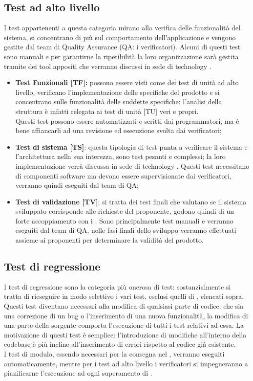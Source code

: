 \documentclass[PianoDiProgetto.tex]{subfiles}
\begin{document}
\subsection{Test ad alto livello}
I test appartenenti a questa categoria mirano alla verifica delle funzionalità del sistema, si concentrano di più sul comportamento dell'applicazione e vengono gestite dal team di Quality Assurance (QA: i verificatori).
Alcuni di questi test sono manuali e per garantirne la ripetibilità la loro organizzazione sarà gestita tramite dei tool appositi che verranno discussi in sede di technology .
\begin{itemize}
	\item \textbf{Test Funzionali [TF]:} possono essere visti come dei test di unità ad alto livello, verificano l'implementazione delle specifiche del prodotto e si concentrano sulle funzionalità delle suddette specifiche: l'analisi della struttura è infatti relegata ai test di unità [TU] veri e propri. \\
	Questi test possono essere automatizzati e scritti dai programmatori, ma è bene affiancarli ad una revisione ed esecuzione svolta dai verificatori;
	\item \textbf{Test di sistema [TS]}: questa tipologia di test punta a verificare il sistema e l'architettura nella sua interezza, sono test pesanti e complessi; la loro implementazione verrà discussa in sede di technology . 
	Questi test necessitano di componenti software ma devono essere supervisionate dai verificatori, verranno quindi eseguiti dal team di QA;
	\item \textbf{Test di validazione [TV]}: si tratta dei test finali che valutano se il sistema sviluppato corrisponde alle richieste del proponente, godono quindi di un forte accoppiamento con i . Sono principalmente test manuali e verranno eseguiti dal team di QA, nelle fasi finali dello sviluppo verranno effettuati assieme ai proponenti per determinare la validità del prodotto.
\end{itemize}

\subsection{Test di regressione}
I test di regressione sono la categoria più onerosa di test: sostanzialmente si tratta di rieseguire in modo selettivo i vari test, esclusi quelli di , elencati sopra.\\
Questi test diventano necessari alla modifica di qualsiasi parte di codice: che sia una correzione di un bug o l'inserimento di una nuova funzionalità, la modifica di una parte della sorgente comporta l'esecuzione di tutti i test relativi ad essa. La motivazione di questi test è semplice: l'introduzione di modifiche all'interno della codebase è più incline all'inserimento di errori rispetto al codice già esistente.\\
I test di modulo, essendo necessari per la consegna nel , verranno eseguiti automaticamente, mentre per i test ad alto livello i verificatori si impegneranno a pianificarne l'esecuzione ad ogni superamento di .
	
\end{document}
